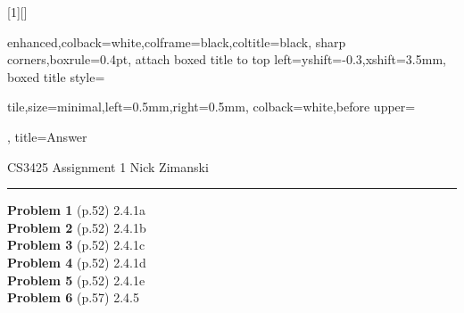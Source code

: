 \documentclass[12pt]{article}
\begin{document}
\thispagestyle{empty}
[1][]{%
  enhanced,colback=white,colframe=black,coltitle=black,
  sharp corners,boxrule=0.4pt,
  attach boxed title to top left={yshift=-0.3\baselineskip-0.4pt,xshift=3.5mm},
  boxed title style={tile,size=minimal,left=0.5mm,right=0.5mm,
    colback=white,before upper=\strut},
  title=Answer
}

{\large CS3425 Assignment 1} \hfill
{\large Nick Zimanski}\\
\hrule
\vspace{1em}
\begin{large}
{\bf \LARGE Problem 1} (p.52) 2.4.1a\\

\newpage
{\bf \LARGE Problem 2} (p.52) 2.4.1b\\

\newpage
{\bf \LARGE Problem 3} (p.52) 2.4.1c\\

\newpage
{\bf \LARGE Problem 4} (p.52) 2.4.1d\\

\newpage
{\bf \LARGE Problem 5} (p.52) 2.4.1e\\

\newpage
{\bf \LARGE Problem 6} (p.57) 2.4.5\\

\newpage
\end{large}
\end{document}
